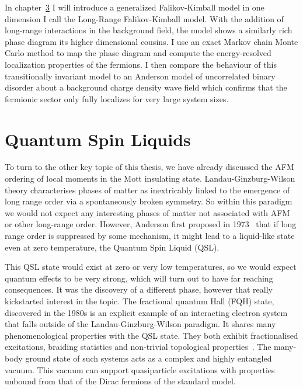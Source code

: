 In chapter~\protect\hyperlink{chap:3-the-long-range-falikov-kimball-model}{3} I will introduce a generalized Falikov-Kimball model in one dimension I call the Long-Range Falikov-Kimball model. With the addition of long-range interactions in the background field, the model shows a similarly rich phase diagram its higher dimensional cousins. I use an exact Markov chain Monte Carlo method to map the phase diagram and compute the energy-resolved localization properties of the fermions. I then compare the behaviour of this transitionally invariant model to an Anderson model of uncorrelated binary disorder about a background charge density wave field which confirms that the fermionic sector only fully localizes for very large system sizes.

\hypertarget{quantum-spin-liquids}{%
\section{Quantum Spin Liquids}\label{quantum-spin-liquids}}

To turn to the other key topic of this thesis, we have already discussed the AFM ordering of local moments in the Mott insulating state. Landau-Ginzburg-Wilson theory characterises phases of matter as inextricably linked to the emergence of long range order via a spontaneously broken symmetry. So within this paradigm we would not expect any interesting phases of matter not associated with AFM or other long-range order. However, Anderson first proposed in 1973~\autocite{andersonResonatingValenceBonds1973} that if long range order is suppressed by some mechanism, it might lead to a liquid-like state even at zero temperature, the Quantum Spin Liquid (QSL).

This QSL state would exist at zero or very low temperatures, so we would expect quantum effects to be very strong, which will turn out to have far reaching consequences. It was the discovery of a different phase, however that really kickstarted interest in the topic. The fractional quantum Hall (FQH) state, discovered in the 1980s is an explicit example of an interacting electron system that falls outside of the Landau-Ginzburg-Wilson paradigm. It shares many phenomenological properties with the QSL state. They both exhibit fractionalised excitations, braiding statistics and non-trivial topological properties~\autocite{broholmQuantumSpinLiquids2020}. The many-body ground state of such systems acts as a complex and highly entangled vacuum. This vacuum can support quasiparticle excitations with properties unbound from that of the Dirac fermions of the standard model.

